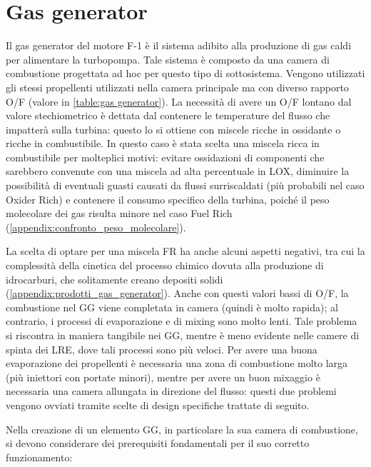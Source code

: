 \section{Gas generator}
\label{sec:gas generator}

Il gas generator del motore F-1 è il sistema adibito alla produzione di gas caldi per alimentare la turbopompa. Tale sistema è composto da una camera di combustione progettata ad hoc per questo tipo di sottosistema.
Vengono utilizzati gli stessi propellenti utilizzati nella camera principale ma con diverso rapporto O/F (valore in \autoref{table:gas generator}). La necessità di avere un O/F lontano dal valore stechiometrico è dettata dal contenere le temperature del flusso che impatterà sulla turbina: questo lo si ottiene con miscele ricche in ossidante o ricche in combustibile.
In questo caso è stata scelta una miscela ricca in combustibile per molteplici motivi: evitare ossidazioni di componenti che sarebbero convenute con una miscela ad alta percentuale in LOX, diminuire la possibilità di eventuali guasti causati da flussi surriscaldati (più probabili nel caso Oxider Rich) e contenere il consumo specifico della turbina, poiché il peso molecolare dei gas risulta minore nel caso Fuel Rich (\autoref{appendix:confronto_peso_molecolare}).

La scelta di optare per una miscela FR ha anche alcuni aspetti negativi, tra cui la complessità della cinetica del processo chimico dovuta alla produzione di idrocarburi, che solitamente creano depositi solidi (\autoref{appendix:prodotti_gas_generator}).
Anche con questi valori bassi di O/F, la combustione nel GG viene completata in camera (quindi è molto rapida); al contrario, i processi di evaporazione e di mixing sono molto lenti. Tale problema si riscontra in maniera tangibile nei GG, mentre è meno evidente nelle camere di spinta dei LRE, dove tali processi sono più veloci.
Per avere una buona evaporazione dei propellenti è necessaria una zona di combustione molto larga (più iniettori con portate minori), mentre per avere un buon mixaggio è necessaria una camera allungata in direzione del flusso: questi due problemi vengono ovviati tramite scelte di design specifiche trattate di seguito.

Nella creazione di un elemento GG, in particolare la sua camera di combustione, si devono considerare dei prerequisiti fondamentali per il suo corretto funzionamento:

